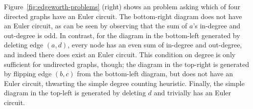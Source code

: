 Figure~\ref{fig:edgeworth-problems} (right) shows an \Edgeworth problem asking which of four directed graphs have an Euler circuit. The bottom-right diagram does not have an Euler circuit, as can be seen by observing that the sum of $a$'s in-degree and out-degree is odd. In contrast, for the diagram in the bottom-left generated by deleting edge $(a, d)$, every node has an even sum of in-degree and out-degree, and indeed there does exist an Euler circuit. This condition on degree is only sufficient for undirected graphs, though; the diagram in the top-right is generated by flipping edge $(b, c)$ from the bottom-left diagram, but does not have an Euler circuit, thwarting the simple degree counting heuristic. Finally, the simple diagram in the top-left is generated by deleting $d$ and trivially has an Euler circuit. 



